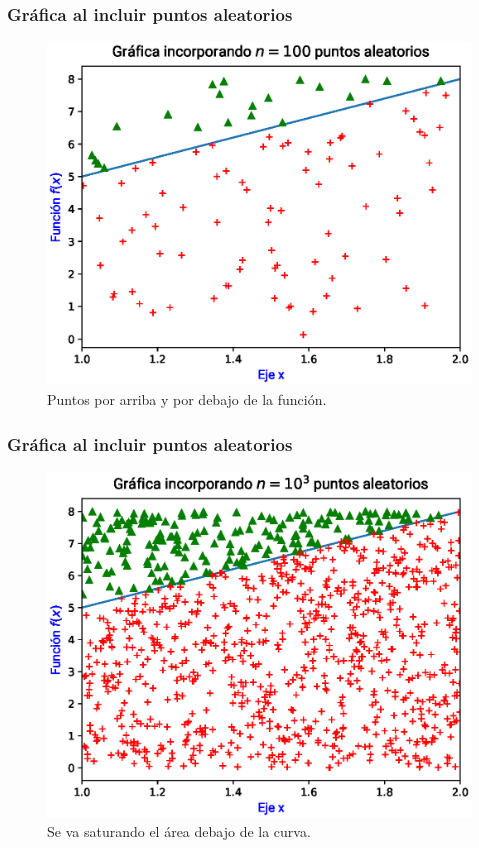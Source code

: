 \begin{frame}
\frametitle{Gráfica al incluir puntos aleatorios}
\begin{figure}[h!]
    \centering
    \includegraphics[scale=0.55]{Imagenes/area_puntos_02.eps}
    \caption{Puntos por arriba y por debajo de la función.}
\end{figure}
\end{frame}
\begin{frame}
\frametitle{Gráfica al incluir puntos aleatorios}
\begin{figure}[h!]
    \centering
    \includegraphics[scale=0.55]{Imagenes/area_puntos_03.eps}
    \caption{Se va saturando el área debajo de la curva.}
\end{figure}
\end{frame}

